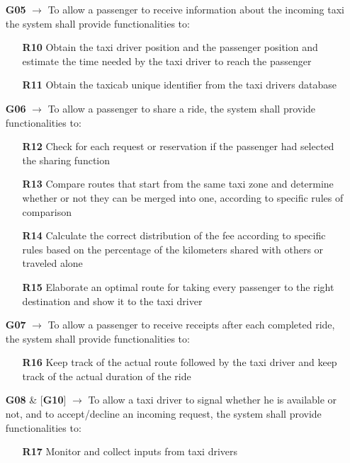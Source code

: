 \begin{itemize}
	\item [\textbf{G05}] $\rightarrow$ To allow a passenger to receive information about the incoming taxi the system shall provide functionalities to:
	\begin{itemize}
		\item [\textbf{R10}] Obtain the taxi driver position and the passenger position and estimate the time needed by the taxi driver to reach the passenger
		\item [\textbf{R11}] Obtain the taxicab unique identifier from the taxi drivers database
	\end{itemize}
	
	\item [\textbf{G06}] $\rightarrow$ To allow a passenger to share a ride, the system shall provide functionalities to:
	\begin{itemize}
		\item [\textbf{R12}] Check for each request or reservation if the passenger had selected the sharing function
		\item [\textbf{R13}] Compare routes that start from the same taxi zone and determine whether or not they can be merged into one, according to specific rules of comparison
		\item [\textbf{R14}] Calculate the correct distribution of the fee according to specific rules based on the percentage of the kilometers shared with others or traveled alone
		\item [\textbf{R15}] Elaborate an optimal route for taking every passenger to the right destination and show it to the taxi driver
	\end{itemize}

	\item [\textbf{G07}] $\rightarrow$ To allow a passenger to receive receipts after each completed ride, the system shall provide functionalities to:
	\begin{itemize}
		\item [\textbf{R16}] Keep track of the actual route followed by the taxi driver and keep track of the actual duration of the ride
	\end{itemize}
	
	\item [\textbf{G08}] \& [\textbf{G10}] $\rightarrow$ To allow a taxi driver to signal whether he is available or not, and to accept/decline an incoming request, the system shall provide functionalities to:
	\begin{itemize}
		\item [\textbf{R17}] Monitor and collect inputs from taxi drivers
	\end{itemize}
	

\end{itemize}
